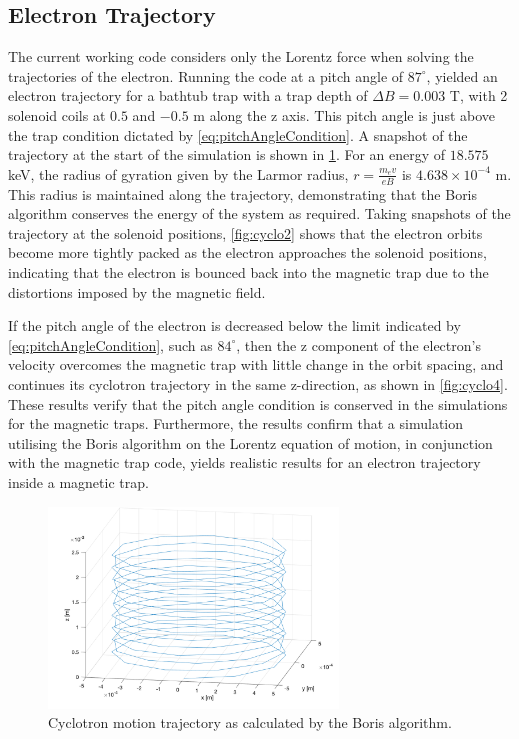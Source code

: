 \documentclass[a4paper,12pt, notitlepage]{article}
\begin{document}
\subsection{Electron Trajectory}
The current working code considers only the Lorentz force when solving the trajectories of the electron. Running the code at a pitch angle of $87^{\circ}$, yielded an electron trajectory for a bathtub trap with a trap depth of $\Delta B = 0.003$ T, with 2 solenoid coils at $0.5$ and $-0.5$ m along the z axis. This pitch angle is just above the trap condition dictated by \cref{eq:pitchAngleCondition}. A snapshot of the trajectory at the start of the simulation is shown in \cref{fig:cyclo1}. For an energy of $18.575$ keV, the radius of gyration given by the Larmor radius, $r = \frac{m_{e}v}{eB}$ is $4.638\times10^{-4}$ m. This radius is maintained along the trajectory, demonstrating that the Boris algorithm conserves the energy of the system as required. Taking snapshots of the trajectory at the solenoid positions, \cref{fig:cyclo2} shows that the electron orbits become more tightly packed as the electron approaches the solenoid positions, indicating that the electron is bounced back into the magnetic trap due to the distortions imposed by the magnetic field.

If the pitch angle of the electron is decreased below the limit indicated by \cref{eq:pitchAngleCondition}, such as $84^{\circ}$, then the z component of the electron's velocity overcomes the magnetic trap with little change in the orbit spacing, and continues its cyclotron trajectory in the same z-direction, as shown in \cref{fig:cyclo4}. These results verify that the pitch angle condition is conserved in the simulations for the magnetic traps. Furthermore, the results confirm that a simulation utilising the Boris algorithm on the Lorentz equation of motion, in conjunction with the magnetic trap code, yields realistic results for an electron trajectory inside a magnetic trap.

\begin{figure}[t!]
\centering
\includegraphics[width=77mm]{pictures/cyclotronMotion1.png}
\vspace{-2mm}
\caption{Cyclotron motion trajectory as calculated by the Boris algorithm.}
\label{fig:cyclo1}
\end{figure}
\end{document}
